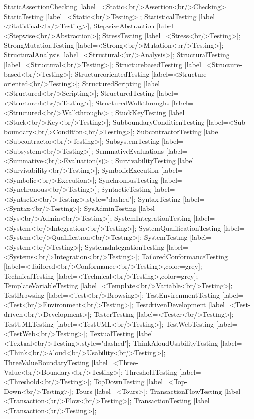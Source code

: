 \documentclass{article}
\begin{document}
{StaticAssertionChecking [label=<Static<br/>Assertion<br/>Checking>];
StaticTesting [label=<Static<br/>Testing>];
StatisticalTesting [label=<Statistical<br/>Testing>];
StepwiseAbstraction [label=<Stepwise<br/>Abstraction>];
StressTesting [label=<Stress<br/>Testing>];
StrongMutationTesting [label=<Strong<br/>Mutation<br/>Testing>];
StructuralAnalysis [label=<Structural<br/>Analysis>];
StructuralTesting [label=<Structural<br/>Testing>];
StructurebasedTesting [label=<Structure-based<br/>Testing>];
StructureorientedTesting [label=<Structure-oriented<br/>Testing>];
StructuredScripting [label=<Structured<br/>Scripting>];
StructuredTesting [label=<Structured<br/>Testing>];
StructuredWalkthroughs [label=<Structured<br/>Walkthroughs>];
StuckKeyTesting [label=<Stuck<br/>Key<br/>Testing>];
SubboundaryConditionTesting [label=<Sub-boundary<br/>Condition<br/>Testing>];
SubcontractorTesting [label=<Subcontractor<br/>Testing>];
SubsystemTesting [label=<Subsystem<br/>Testing>];
SummativeEvaluations [label=<Summative<br/>Evaluation(s)>];
SurvivabilityTesting [label=<Survivability<br/>Testing>];
SymbolicExecution [label=<Symbolic<br/>Execution>];
SynchronousTesting [label=<Synchronous<br/>Testing>];
SyntacticTesting [label=<Syntactic<br/>Testing>,style="dashed"];
SyntaxTesting [label=<Syntax<br/>Testing>];
SysAdminTesting [label=<Sys<br/>Admin<br/>Testing>];
SystemIntegrationTesting [label=<System<br/>Integration<br/>Testing>];
SystemQualificationTesting [label=<System<br/>Qualification<br/>Testing>];
SystemTesting [label=<System<br/>Testing>];
SystemsIntegrationTesting [label=<Systems<br/>Integration<br/>Testing>];
TailoredConformanceTesting [label=<Tailored<br/>Conformance<br/>Testing>,color=grey];
TechnicalTesting [label=<Technical<br/>Testing>,color=grey];
TemplateVariableTesting [label=<Template<br/>Variable<br/>Testing>];
TestBrowsing [label=<Test<br/>Browsing>];
TestEnvironmentTesting [label=<Test<br/>Environment<br/>Testing>];
TestdrivenDevelopment [label=<Test-driven<br/>Development>];
TesterTesting [label=<Tester<br/>Testing>];
TestUMLTesting [label=<TestUML<br/>Testing>];
TestWebTesting [label=<TestWeb<br/>Testing>];
TextualTesting [label=<Textual<br/>Testing>,style="dashed"];
ThinkAloudUsabilityTesting [label=<Think<br/>Aloud<br/>Usability<br/>Testing>];
ThreeValueBoundaryTesting [label=<Three-Value<br/>Boundary<br/>Testing>];
ThresholdTesting [label=<Threshold<br/>Testing>];
TopDownTesting [label=<Top-Down<br/>Testing>];
Tours [label=<Tours>];
TransactionFlowTesting [label=<Transaction<br/>Flow<br/>Testing>];
TransactionTesting [label=<Transaction<br/>Testing>];
}
\end{document}
